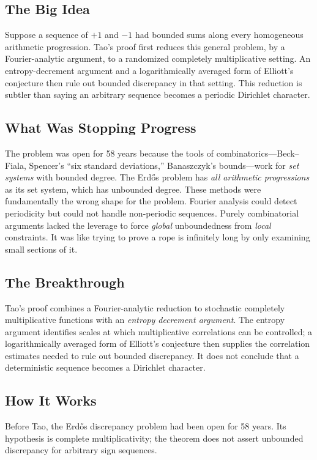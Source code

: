 \subsection{The Big Idea}
Suppose a sequence of $+1$ and $-1$ had bounded sums along every homogeneous arithmetic progression. Tao's proof first reduces this general problem, by a Fourier-analytic argument, to a randomized completely multiplicative setting. An entropy-decrement argument and a logarithmically averaged form of Elliott's conjecture then rule out bounded discrepancy in that setting. This reduction is subtler than saying an arbitrary sequence becomes a periodic Dirichlet character.

\subsection{What Was Stopping Progress}
The problem was open for 58 years because the tools of combinatorics---Beck--Fiala, Spencer's ``six standard deviations,'' Banaszczyk's bounds---work for \emph{set systems} with bounded degree. The Erd\H{o}s problem has \emph{all arithmetic progressions} as its set system, which has unbounded degree. These methods were fundamentally the wrong shape for the problem. Fourier analysis could detect periodicity but could not handle non-periodic sequences. Purely combinatorial arguments lacked the leverage to force \emph{global} unboundedness from \emph{local} constraints. It was like trying to prove a rope is infinitely long by only examining small sections of it.

\subsection{The Breakthrough}
Tao's proof combines a Fourier-analytic reduction to stochastic completely multiplicative functions with an \emph{entropy decrement argument}. The entropy argument identifies scales at which multiplicative correlations can be controlled; a logarithmically averaged form of Elliott's conjecture then supplies the correlation estimates needed to rule out bounded discrepancy. It does not conclude that a deterministic sequence becomes a Dirichlet character.

\subsection{How It Works}

Before Tao, the Erd\H{o}s discrepancy problem had been open for 58 years. Its hypothesis is complete multiplicativity; the theorem does not assert unbounded discrepancy for arbitrary sign sequences.

